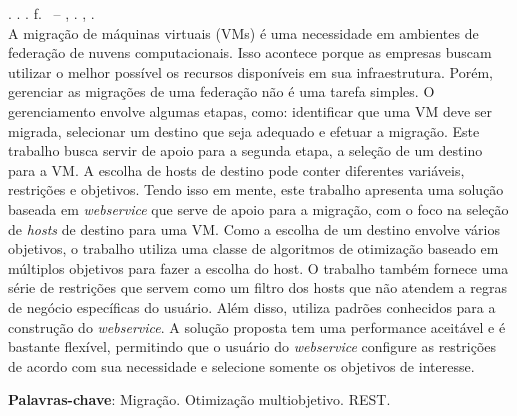 \begin{resumo}[RESUMO]
\begin{SingleSpacing}

\imprimirautorcitacao. \imprimirtitulo. \imprimirdata. \pageref {LastPage} f. \imprimirprojeto\ – \imprimirprograma, \imprimirinstituicao. \imprimirlocal, \imprimirdata.\\

A migração de máquinas virtuais (VMs) é uma necessidade em ambientes 
de federação de nuvens computacionais. Isso acontece porque as empresas
buscam utilizar o melhor possível os recursos disponíveis em sua infraestrutura.
Porém, gerenciar as migrações de uma federação não é uma tarefa simples. O gerenciamento
envolve algumas etapas, como: identificar que uma VM deve ser migrada, selecionar um
destino que seja adequado e efetuar a migração. Este trabalho busca servir de apoio 
para a segunda etapa, a seleção de um destino para a VM. A escolha de hosts de destino pode conter
diferentes variáveis, restrições e objetivos. Tendo isso em mente, este trabalho apresenta uma solução
baseada em \textit{webservice} que serve de apoio para a migração, com o foco na seleção 
de \textit{hosts} de destino para uma VM. Como a escolha de um destino envolve 
vários objetivos, o trabalho utiliza uma classe de algoritmos de otimização baseado em 
múltiplos objetivos para fazer a escolha do host. O trabalho também fornece uma série de restrições
que servem como um filtro dos hosts que não atendem a regras de negócio específicas do usuário.
Além disso, utiliza padrões conhecidos para a construção do \textit{webservice}.  
A solução proposta tem uma performance aceitável e é bastante flexível, permitindo que o 
usuário do \textit{webservice} configure as restrições de acordo com sua necessidade e 
selecione somente os objetivos de interesse.

\textbf{Palavras-chave}: Migração. Otimização multiobjetivo. REST.

\end{SingleSpacing}
\end{resumo}
